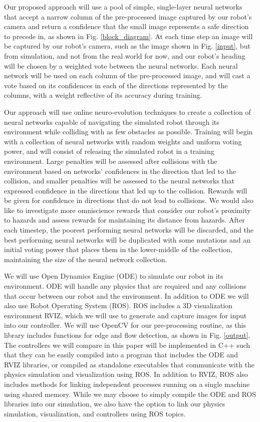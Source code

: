 \documentclass[letterpaper, 10 pt, conference]{ieeeconf}
\begin{document}
		Our proposed approach will use a pool of simple, single-layer neural networks that accept a narrow column of the pre-processed image captured by our robot's camera and return a confidence that the small image represents a safe direction to precede in, as shown in Fig. \ref{block_diagram}.  At each time step an image will be captured by our robot's camera, such as the image shown in Fig. \ref{input}, but from simulation, and not from the real world for now, and our robot's heading will be chosen by a weighted vote between the neural networks.  Each neural network will be used on each column of the pre-processed image, and will cast a vote based on its confidences in each of the directions represented by the columns, with a weight reflective of its accuracy during training.

		Our approach will use online neuro-evolution techniques to create a collection of neural networks capable of navigating the simulated robot through its environment while colliding with as few obstacles as possible.  Training will begin with a collection of neural networks with random weights and uniform voting power, and will consist of releasing the simulated robot in a training environment.  Large penalties will be assessed after collisions with the environment based on networks' confidences in the direction that led to the collision, and smaller penalties will be assessed to the neural networks that expressed confidence in the directions that led up to the collision.  Rewards will be given for confidence in directions that do not lead to collisions.  We would also like to investigate more omniscience rewards that consider our robot's proximity to hazards and assess rewards for maintaining its distance from hazards.  After each timestep, the poorest performing neural networks will be discarded, and the best performing neural networks will be duplicated with some mutations and an initial voting power that places them in the lower-middle of the collection, maintaining the size of the neural network collection. 

		We will use Open Dynamics Engine (ODE) to simulate our robot in its environment.  ODE will handle any physics that are required and any collisions that occur between our robot and the environment.  In addition to ODE we will also use Robot Operating System (ROS).  ROS includes a 3D visualization environment RVIZ, which we will use to generate and capture images for input into our controller.  We will use OpenCV for our pre-processing routine, as this library includes functions for edge and flow detection, as shown in Fig. \ref{output}.  The controllers we will compare in this paper will be implemented in C++ such that they can be easily compiled into a program that includes the ODE and RVIZ libraries, or compiled as standalone executables that communicate with the physics simulation and visualization using ROS.  In addition to RVIZ, ROS also includes methods for linking independent processes running on a single machine using shared memory.  While we may choose to simply compile the ODE and ROS libraries into our simulation, we also have the option to link our physics simulation, visualization, and controllers using ROS topics. 
\end{document}

